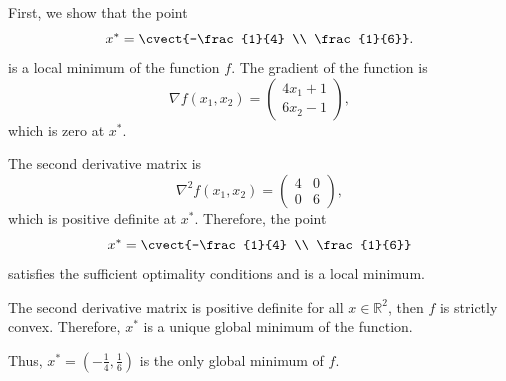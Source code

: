 
First, we show that the point
\[
x^*=\cvect{-\frac{1}{4} \\ \frac{1}{6}}.
\]
is a local minimum of the function $f$.
The gradient of the function is $$\nabla f(x_1,x_2)=\begin{pmatrix*}
4x_1+1 \\ 6 x_2 -1 \end{pmatrix*},$$ which is zero at
$x^*$.

\begin{center}
\end{center}



The second derivative  matrix is $$\nabla^2
f(x_1,x_2)= \begin{pmatrix*} 4 & 0 \\ 0 & 6 \end{pmatrix*},$$ which is
positive definite at $x^*$. Therefore, the point
\[
x^*=\cvect{-\frac{1}{4} \\ \frac{1}{6}}
\]
satisfies the sufficient optimality conditions and is a local minimum.

The second derivative matrix is positive definite for all
$x\in \mathbb{R}^2$, then $f$ is strictly convex. Therefore, $x^*$ is
a unique global minimum of the function. 

%
%

Thus, $x^*=(-\frac{1}{4},\frac{1}{6})$ is the only global minimum of $f$.


